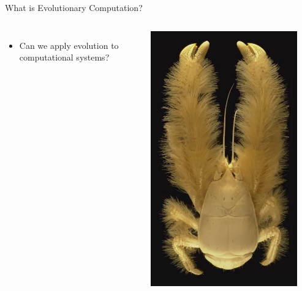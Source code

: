 \documentclass[aspectratio=169]{beamer}
\begin{document}
\begin{frame}[t]{What is Evolutionary Computation?}
\begin{columns}
\begin{itemize}
      \item Can we apply evolution to computational systems?
    \end{itemize}
    \includegraphics[width=0.9\textwidth]{img/underwater_3.png}
  \end{columns}
\end{frame}
\end{document}
